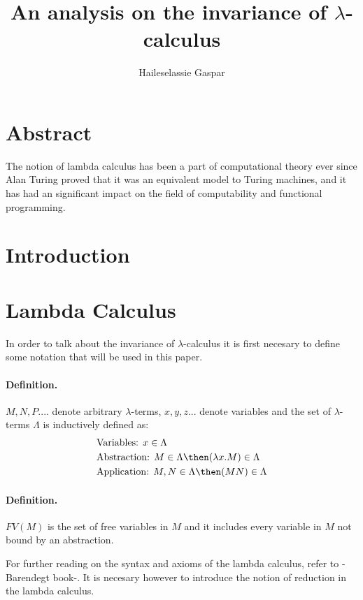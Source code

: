 \documentclass[12pt]{article}
\title{An analysis on the invariance of $\lambda$-calculus}
\author{Haileselassie Gaspar}
\begin{document}
\maketitle

\section{Abstract}
The notion of lambda calculus has been a part of computational theory ever since Alan Turing proved that it was an equivalent model to Turing machines, and it has had an significant impact on the field of computability and functional programming.
\section{Introduction}

\section{Lambda Calculus}
In order to talk about the invariance of $\lambda$-calculus it is first necesary to define some notation that will be used in this paper.
\paragraph{Definition.}$M, N, P....$ denote arbitrary $\lambda$-terms, $x,y,z...$ denote variables and
the set of $\lambda$-terms $\Lambda$ is inductively defined as:
\begin{equation}
  \begin{align}
  &\text{Variables: } x \in \Lambda \\
  &\text{Abstraction: }M \in \Lambda \then (\lambda x.M) \in \Lambda \\
  &\text{Application: }M, N \in \Lambda \then (MN) \in \Lambda
  \end{align}
\end{equation}

\paragraph{Definition.} $FV(M)$ is the set of free variables in $M$ and it includes every variable in $M$ not bound by an abstraction.

For further reading on the syntax and axioms of the lambda calculus, refer to -Barendegt book-. It is necesary however to introduce the notion of reduction in the lambda calculus.
\end{document}
